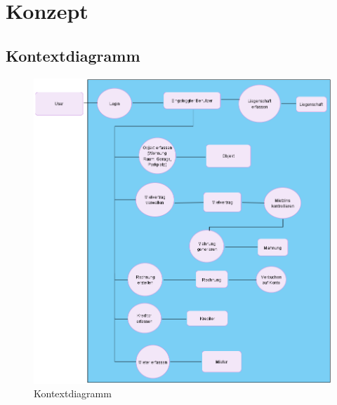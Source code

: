 \section{Konzept}

\subsection{Kontextdiagramm}
\begin{figure}[H]
  \begin{center}
    \includegraphics[width=0.99\linewidth]{content/diagrams/out/contextdiagram/context.png}
    \caption{Kontextdiagramm}
  \end{center}
  \label{contextdiag}
\end{figure}

